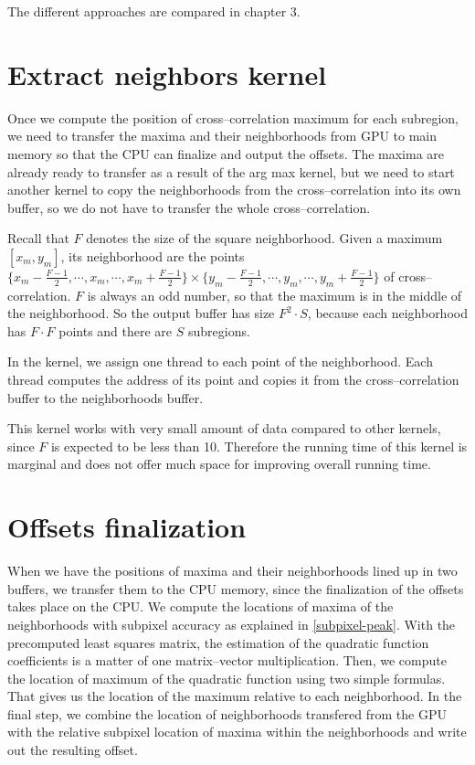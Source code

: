 The different approaches are compared in chapter 3.

\section{Extract neighbors kernel}

Once we compute the position of cross--correlation maximum for each subregion, we need to transfer the maxima and their neighborhoods from GPU to main memory so that the CPU can finalize and output the offsets. The maxima are already ready to transfer as a result of the arg max kernel, but we need to start another kernel to copy the neighborhoods from the cross--correlation into its own buffer, so we do not have to transfer the whole cross--correlation.

Recall that $F$ denotes the size of the square neighborhood. Given a maximum $[x_m, y_m]$, its neighborhood are the points $\{x_m - \frac{F-1}{2}, \cdots, x_m, \cdots, x_m + \frac{F-1}{2}\} \times \{y_m - \frac{F-1}{2}, \cdots, y_m, \cdots, y_m + \frac{F-1}{2}\}$ of cross--correlation. $F$ is always an odd number, so that the maximum is in the middle of the neighborhood. So the output buffer has size $F^2 \cdot S$, because each neighborhood has $F \cdot F$ points and there are $S$ subregions.

In the kernel, we assign one thread to each point of the neighborhood. Each thread computes the address of its point and copies it from the cross--correlation buffer to the neighborhoods buffer.

This kernel works with very small amount of data compared to other kernels, since $F$ is expected to be less than 10. Therefore the running time of this kernel is marginal and does not offer much space for improving overall running time.

\section{Offsets finalization}

When we have the positions of maxima and their neighborhoods lined up in two buffers, we transfer them to the CPU memory, since the finalization of the offsets takes place on the CPU. We compute the locations of maxima of the neighborhoods with subpixel accuracy as explained in \cref{subpixel-peak}. With the precomputed least squares matrix, the estimation of the quadratic function coefficients is a matter of one matrix--vector multiplication. Then, we compute the location of maximum of the quadratic function using two simple formulas. That gives us the location of the maximum relative to each neighborhood. In the final step, we combine the location of neighborhoods transfered from the GPU with the relative subpixel location of maxima within the neighborhoods and write out the resulting offset.
